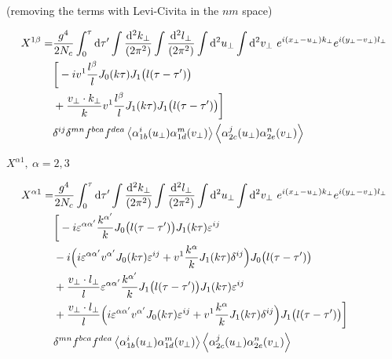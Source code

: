(removing the terms with Levi-Civita in the $nm$ space)

\begin{equation*}
\begin{split}
 X^{1 \beta} = &
\frac{g^4}{2 N_c}
\int_0^\tau \mathop{}\!\mathrm{d} \tau'
\int \frac{\mathop{}\!\mathrm{d}^2 k_\perp}{(2\pi^2)}
\int \frac{\mathop{}\!\mathrm{d}^2 l_\perp}{(2\pi^2)}
\int \mathop{}\!\mathrm{d}^2 u_\perp
\int \mathop{}\!\mathrm{d}^2 v_\perp ~
e^{i (x_\perp - u_\perp) k_\perp}
e^{i (y_\perp - v_\perp) l_\perp} \\
& \bigg[ - i v^1 \frac{l^\beta}{l} J_0(k \tau) J_1\big(l(\tau-\tau') \big)    \\
& + \frac{v_\perp \cdot k_\perp}{k}  v^1 \frac{l^\beta}{l} J_1 (k\tau) J_1\big(l(\tau-\tau') \big)  \bigg]\\
& \delta^{ij} \delta^{mn} f^{bca} f^{dea}
\left< \alpha^i_{1b} (u_\perp) \alpha^m_{1d} (v_\perp) \right>  \left< \alpha^j_{2c} (u_\perp) \alpha^n_{2e} (v_\perp) \right>
\end{split}
\end{equation*}

\newpage

$X^{\alpha 1}, ~\alpha=2,3$

\begin{equation*}
\begin{split}
 X^{\alpha 1} = &
\frac{g^4}{2 N_c}
\int_0^\tau \mathop{}\!\mathrm{d} \tau'
\int \frac{\mathop{}\!\mathrm{d}^2 k_\perp}{(2\pi^2)}
\int \frac{\mathop{}\!\mathrm{d}^2 l_\perp}{(2\pi^2)}
\int \mathop{}\!\mathrm{d}^2 u_\perp
\int \mathop{}\!\mathrm{d}^2 v_\perp ~
e^{i (x_\perp - u_\perp) k_\perp}
e^{i (y_\perp - v_\perp) l_\perp} \\
& \bigg[ - i \varepsilon^{\alpha \alpha'} \frac{k^{\alpha'}}{k} J_0\big(l (\tau-\tau')\big) J_1(k \tau) \varepsilon^{ij}  \\
& - i \Big(i \varepsilon^{\alpha \alpha'} v^{\alpha'} J_0(k \tau) \varepsilon^{ij} + v^1 \frac{k^\alpha}{k} J_1(k \tau) \delta^{ij} \Big) J_0\big(l(\tau-\tau')\big)  \\
& + \frac{v_\perp \cdot l_\perp}{l} \varepsilon^{\alpha \alpha'} \frac{k^{\alpha'}}{k} J_1\big(l(\tau-\tau')\big) J_1(k\tau) \varepsilon^{ij}  \\
& + \frac{v_\perp \cdot l_\perp}{l} \Big( i \varepsilon^{\alpha \alpha'} v^{\alpha'} J_0 (k\tau) \varepsilon^{ij} + v^1 \frac{k^\alpha}{k} J_1(k\tau) \delta^{ij} \Big) J_1\big(l(\tau-\tau')\big)  \bigg]\\
& \delta^{mn}  f^{bca} f^{dea}
\left< \alpha^i_{1b} (u_\perp) \alpha^m_{1d} (v_\perp) \right>  \left< \alpha^j_{2c} (u_\perp) \alpha^n_{2e} (v_\perp) \right>
\end{split}
\end{equation*}

